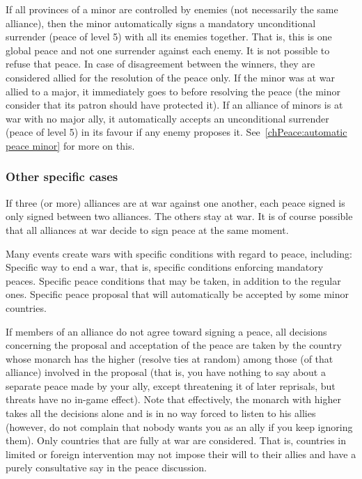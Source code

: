 \label{chPeace:Mandatory peace minors}
\bparag If all provinces of a minor are controlled by enemies (not necessarily
the same alliance), then the minor automatically signs a mandatory
unconditional surrender (peace of level 5) with all its enemies together. That
is, this is one global peace and not one surrender against each enemy.
\bparag It is not possible to refuse that peace. In case of disagreement
between the winners, they are considered allied for the resolution of the
peace only.
\bparag If the minor was at war allied to a major, it immediately goes to
\Neutral before resolving the peace (the minor consider that its patron should
have protected it).
\bparag If an alliance of minors is at war with no major ally, it
automatically accepts an unconditional surrender (peace of level 5) in its
favour if any enemy proposes it. See~\ref{chPeace:automatic peace minor} for
more on this.

\subsubsection{Other specific cases}
\bparag If three (or more) alliances are at war against one another, each
peace signed is only signed between two alliances. The others stay at war.
\bparag It is of course possible that all alliances at war decide to sign
peace at the same moment.

 Many events create wars with specific conditions
with regard to peace, including:
\bparag Specific way to end a war, that is, specific conditions enforcing
mandatory peaces.
\bparag Specific peace conditions that may be taken, in addition to the
regular ones.
\bparag Specific peace proposal that will automatically be accepted by some
minor countries.

\aparag[Disagreements]
\bparag If members of an alliance do not agree toward signing a peace, all
decisions concerning the proposal and acceptation of the peace are taken by
the country whose monarch has the higher \DIP (resolve ties at random) among
those (of that alliance) involved in the proposal (that is, you have nothing
to say about a separate peace made by your ally, except threatening it of
later reprisals, but threats have no in-game effect).
\bparag Note that effectively, the monarch with higher \DIP takes all the
decisions alone and is in no way forced to listen to his allies (however, do
not complain that nobody wants you as an ally if you keep ignoring them).
\bparag Only countries that are fully at war are considered. That is,
countries in limited or foreign intervention may not impose their will to
their allies and have a purely consultative say in the peace discussion.

